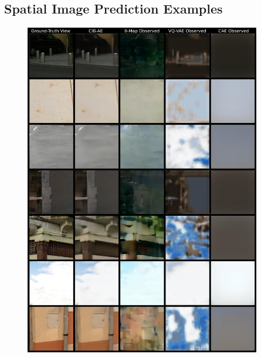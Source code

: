 \begin{appendices}
\chapter{Spatial Image Prediction Examples} \label{ch:app-predictions}
\begin{figure}
    \centering
    \includegraphics[width=0.92\textwidth]{figures/ptz/train_stacked_0}
\end{figure}
\begin{figure}
    \centering

\end{figure}
\end{appendices}
